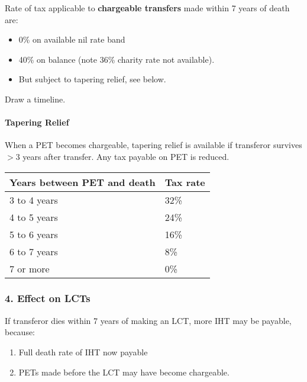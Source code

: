\documentclass[
]{article}
\newenvironment{Shaded}{}{}
\newcommand{\NormalTok}[1]{#1}
\providecommand{\tightlist}{%
  \setlength{\itemsep}{0pt}\setlength{\parskip}{0pt}}
\begin{document}
Rate of tax applicable to \textbf{chargeable transfers} made within 7
years of death are:

\begin{itemize}
\tightlist
\item
  0\% on available nil rate band
\item
  40\% on balance (note 36\% charity rate not available).
\item
  But subject to tapering relief, see below.
\end{itemize}

\begin{Shaded}
\begin{Highlighting}[]
\NormalTok{Draw a timeline. }
\end{Highlighting}
\end{Shaded}

\hypertarget{tapering-relief}{%
\paragraph{Tapering Relief}\label{tapering-relief}}

When a PET becomes chargeable, tapering relief is available if
transferor survives \(>3\) years after transfer. Any tax payable on PET
is reduced.

\begin{longtable}[]{@{}ll@{}}
\toprule()
Years between PET and death & Tax rate \\
\midrule()
\endhead
3 to 4 years & 32\% \\
4 to 5 years & 24\% \\
5 to 6 years & 16\% \\
6 to 7 years & 8\% \\
7 or more & 0\% \\
\bottomrule()
\end{longtable}

\hypertarget{effect-on-lcts}{%
\subsubsection{4. Effect on LCTs}\label{effect-on-lcts}}

If transferor dies within 7 years of making an LCT, more IHT may be
payable, because:

\begin{enumerate}
\def\labelenumi{\arabic{enumi}.}
\tightlist
\item
  Full death rate of IHT now payable
\item
  PETs made before the LCT may have become chargeable.
\end{enumerate}
\end{document}
